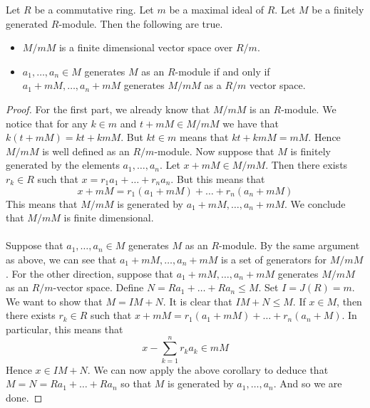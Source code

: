 \documentclass[a4paper]{article}
\begin{document}
\begin{crl}{}{} Let $R$ be a commutative ring. Let $m$ be a maximal ideal of $R$. Let $M$ be a finitely generated $R$-module. Then the following are true. 
\begin{itemize}
\item $M/mM$ is a finite dimensional vector space over $R/m$. 
\item $a_1,\dots,a_n\in M$ generates $M$ as an $R$-module if and only if $a_1+mM,\dots,a_n+mM$ generates $M/mM$ as a $R/m$ vector space. 
\end{itemize} \tcbline
\begin{proof}
For the first part, we already know that $M/mM$ is an $R$-module. We notice that for any $k\in m$ and $t+mM\in M/mM$ we have that $k(t+mM)=kt+kmM$. But $kt\in m$ means that $kt+kmM=mM$. Hence $M/mM$ is well defined as an $R/m$-module. Now suppose that $M$ is finitely generated by the elements $a_1,\dots,a_n$. Let $x+mM\in M/mM$. Then there exists $r_k\in R$ such that $x=r_1a_1+\dots+r_na_n$. But this means that $$x+mM=r_1(a_1+mM)+\dots+r_n(a_n+mM)$$ This means that $M/mM$ is generated by $a_1+mM,\dots,a_n+mM$. We conclude that $M/mM$ is finite dimensional. \\~\\

Suppose that $a_1,\dots,a_n\in M$ generates $M$ as an $R$-module. By the same argument as above, we can see that $a_1+mM,\dots,a_n+mM$ is a set of generators for $M/mM$. For the other direction, suppose that $a_1+mM,\dots,a_n+mM$ generates $M/mM$ as an $R/m$-vector space. Define $N=Ra_1+\dots+Ra_n\leq M$. Set $I=J(R)=m$. We want to show that $M=IM+N$. It is clear that $IM+N\leq M$. If $x\in M$, then there exists $r_k\in R$ such that $x+mM=r_1(a_1+mM)+\dots+r_n(a_n+M)$. In particular, this means that $$x-\sum_{k=1}^nr_ka_k\in mM$$ Hence $x\in IM+N$. We can now apply the above corollary to deduce that $M=N=Ra_1+\dots+Ra_n$ so that $M$ is generated by $a_1,\dots,a_n$. And so we are done. 
\end{proof}
\end{crl}
\end{document}
